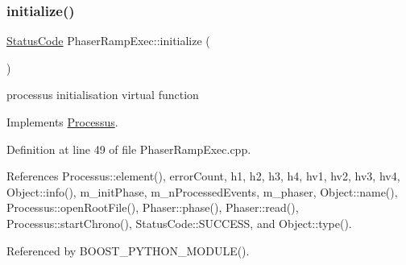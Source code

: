 \subsubsection{\texorpdfstring{initialize()}{initialize()}}
{\footnotesize\ttfamily \hyperlink{classStatusCode}{Status\+Code} Phaser\+Ramp\+Exec\+::initialize (\begin{DoxyParamCaption}{ }\end{DoxyParamCaption})\hspace{0.3cm}{\ttfamily [virtual]}}

processus initialisation virtual function 

Implements \hyperlink{classProcessus_aee88ad7b77ae7319cf8b128e9dd2ea11}{Processus}.



Definition at line 49 of file Phaser\+Ramp\+Exec.\+cpp.



References Processus\+::element(), error\+Count, h1, h2, h3, h4, hv1, hv2, hv3, hv4, Object\+::info(), m\+\_\+init\+Phase, m\+\_\+n\+Processed\+Events, m\+\_\+phaser, Object\+::name(), Processus\+::open\+Root\+File(), Phaser\+::phase(), Phaser\+::read(), Processus\+::start\+Chrono(), Status\+Code\+::\+S\+U\+C\+C\+E\+SS, and Object\+::type().



Referenced by B\+O\+O\+S\+T\+\_\+\+P\+Y\+T\+H\+O\+N\+\_\+\+M\+O\+D\+U\+L\+E().


